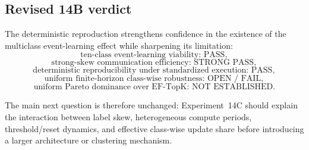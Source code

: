\subsection{Revised 14B verdict}

The deterministic reproduction strengthens confidence in the existence of the multiclass event-learning effect while sharpening its limitation:
\begin{equation}
\boxed{\text{ten-class event-learning viability: PASS}},
\end{equation}
\begin{equation}
\boxed{\text{strong-skew communication efficiency: STRONG PASS}},
\end{equation}
\begin{equation}
\boxed{\text{deterministic reproducibility under standardized execution: PASS}},
\end{equation}
\begin{equation}
\boxed{\text{uniform finite-horizon class-wise robustness: OPEN / FAIL}},
\end{equation}
\begin{equation}
\boxed{\text{uniform Pareto dominance over EF-TopK: NOT ESTABLISHED}}.
\end{equation}

The main next question is therefore unchanged: Experiment~14C should explain the interaction between label skew, heterogeneous compute periods, threshold/reset dynamics, and effective class-wise update share before introducing a larger architecture or clustering mechanism.
